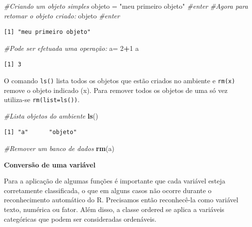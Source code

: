 \documentclass[12pt,portuguese,oneside]{book}
\newenvironment{Shaded}{\begin{snugshade}}{\end{snugshade}}
\newcommand{\KeywordTok}[1]{\textcolor[rgb]{0.13,0.29,0.53}{\textbf{#1}}}
\newcommand{\DecValTok}[1]{\textcolor[rgb]{0.00,0.00,0.81}{#1}}
\newcommand{\StringTok}[1]{\textcolor[rgb]{0.31,0.60,0.02}{#1}}
\newcommand{\CommentTok}[1]{\textcolor[rgb]{0.56,0.35,0.01}{\textit{#1}}}
\newcommand{\OperatorTok}[1]{\textcolor[rgb]{0.81,0.36,0.00}{\textbf{#1}}}
\newcommand{\NormalTok}[1]{#1}
\begin{document}
\begin{Shaded}
\begin{Highlighting}[]
\CommentTok{#Criando um objeto simples}
\NormalTok{objeto =}\StringTok{ "meu primeiro objeto"} \CommentTok{#enter}
\CommentTok{#Agora para retomar o objeto criado:}
\NormalTok{objeto }\CommentTok{#enter}
\end{Highlighting}
\end{Shaded}

\begin{verbatim}
[1] "meu primeiro objeto"
\end{verbatim}

\begin{Shaded}
\begin{Highlighting}[]
\CommentTok{#Pode ser efetuada uma operação:}
\NormalTok{a=}\StringTok{ }\DecValTok{2}\OperatorTok{+}\DecValTok{1}
\NormalTok{a}
\end{Highlighting}
\end{Shaded}

\begin{verbatim}
[1] 3
\end{verbatim}

O comando \texttt{ls()} lista todos os objetos que estão criados no
ambiente e \texttt{rm(x)} remove o objeto indicado (x). Para remover
todos os objetos de uma só vez utiliza-se \texttt{rm(list=ls())}.

\begin{Shaded}
\begin{Highlighting}[]
\CommentTok{#Lista objetos do ambiente}
\KeywordTok{ls}\NormalTok{()}
\end{Highlighting}
\end{Shaded}

\begin{verbatim}
[1] "a"      "objeto"
\end{verbatim}

\begin{Shaded}
\begin{Highlighting}[]
\CommentTok{#Remover um banco de dados}
\KeywordTok{rm}\NormalTok{(a)}
\end{Highlighting}
\end{Shaded}

\textbf{Conversão de uma variável}

Para a aplicação de algumas funções é importante que cada variável
esteja corretamente classificada, o que em alguns casos não ocorre
durante o reconhecimento automático do R. Precisamos então reconhecê-la
como variável texto, numérica ou fator. Além disso, a classe ordered se
aplica a variáveis categóricas que podem ser consideradas ordenáveis.
\end{document}
